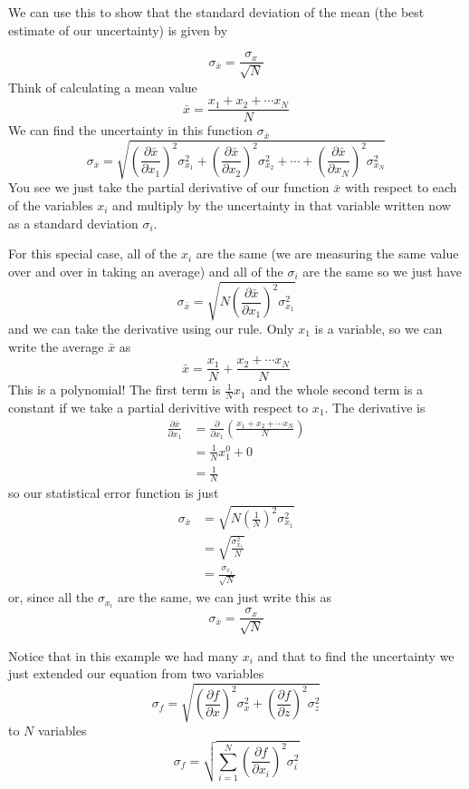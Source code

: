 \documentclass{book}
\begin{document}
We can use this to show that the standard deviation of the mean (the best
estimate of our uncertainty) is given by

\[
\sigma_{\bar{x}}=\frac{\sigma_{x}}{\sqrt{N}}
\]
Think of calculating a mean value
\[
\bar{x}=\frac{x_{1}+x_{2}+\cdots x_{N}}{N}
\]
We can find the uncertainty in this function $\sigma_{\bar{x}}$
\[
\sigma_{\bar{x}}=\sqrt{\left(  \frac{\partial\bar{x}}{\partial x_{1}}\right)
^{2}\sigma_{x_{1}}^{2}+\left(  \frac{\partial\bar{x}}{\partial x_{2}}\right)
^{2}\sigma_{x_{2}}^{2}+\cdots+\left(  \frac{\partial\bar{x}}{\partial x_{N}
}\right)  ^{2}\sigma_{x_{N}}^{2}}
\]
You see we just take the partial derivative of our function $\bar{x}$ with
respect to each of the variables $x_{i}$ and multiply by the uncertainty in
that variable written now as a standard deviation $\sigma_{i}.$

For this special case, all of the $x_{i}$ are the same (we are measuring the
same value over and over in taking an average) and all of the $\sigma_{i}$ are
the same so we just have
\[
\sigma_{\bar{x}}=\sqrt{N\left(  \frac{\partial\bar{x}}{\partial x_{1}}\right)
^{2}\sigma_{x_{1}}^{2}}
\]
and we can take the derivative using our rule. Only $x_{1}$ is a variable, so
we can write the average $\bar{x}$ as
\[
\bar{x}=\frac{x_{1}}{N}+\frac{x_{2}+\cdots x_{N}}{N}
\]
This is a polynomial! The first term is $\frac{1}{N}x_{1}$ and the whole
second term is a constant if we take a partial derivitive with respect to
$x_{1}$. The derivative is
\begin{align*}
\frac{\partial\bar{x}}{\partial x_{1}}  & =\frac{\partial}{\partial x_{1}
}\left(  \frac{x_{1}+x_{2}+\cdots x_{N}}{N}\right) \\
& =\frac{1}{N}x_{1}^{0}+0\\
& =\frac{1}{N}
\end{align*}
so our statistical error function is just
\begin{align*}
\sigma_{\bar{x}}  & =\sqrt{N\left(  \frac{1}{N}\right)  ^{2}\sigma_{x_{1}}
^{2}}\\
& =\sqrt{\frac{\sigma_{x_{1}}^{2}}{N}}\\
& =\frac{\sigma_{x_{1}}}{\sqrt{N}}
\end{align*}
or, since all the $\sigma_{x_{i}}$ are the same, we can just write this as
\[
\sigma_{\bar{x}}=\frac{\sigma_{x}}{\sqrt{N}}
\]


Notice that in this example we had many $x_{i}$ and that to find the
uncertainty we just extended our equation from two variables
\[
\sigma_{f}=\sqrt{\left(  \frac{\partial f}{\partial x}\right)  ^{2}\sigma
_{x}^{2}+\left(  \frac{\partial f}{\partial z}\right)  ^{2}\sigma_{z}^{2}}
\]
to $N$ variables
\[
\sigma_{f}=\sqrt{\sum_{i=1}^{N}\left(  \frac{\partial f}{\partial x_{i}
}\right)  ^{2}\sigma_{i}^{2}}
\]
\end{document}
